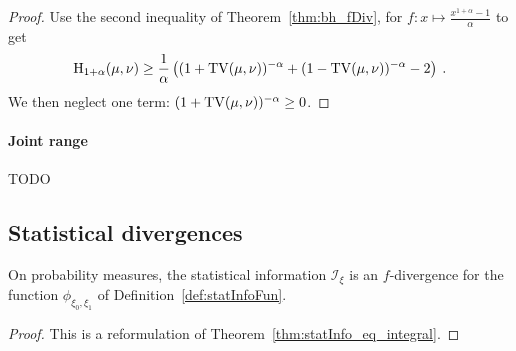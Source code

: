 \begin{proof}%
{}
Use the second inequality of Theorem~\ref{thm:bh_fDiv}, for $f: x \mapsto \frac{x^{1+\alpha} - 1}{\alpha}$ to get
\begin{align*}
\operatorname{H}_{1+\alpha}(\mu, \nu) \ge \frac{1}{\alpha} \left((1 + \operatorname{TV}(\mu, \nu))^{-\alpha} + (1 - \operatorname{TV}(\mu, \nu))^{-\alpha} - 2 \right) \: .
\end{align*}
We then neglect one term: $(1 + \operatorname{TV}(\mu, \nu))^{-\alpha} \ge 0$.
\end{proof}


\paragraph{Joint range}

TODO \cite{harremoes2011pairs}


\subsection{Statistical divergences}

\begin{lemma}
  \label{lem:statInfo_eq_fDiv}
  On probability measures, the statistical information $\mathcal I_\xi$ is an $f$-divergence for the function $\phi_{\xi_0, \xi_1}$ of Definition~\ref{def:statInfoFun}.
\end{lemma}

\begin{proof}%
{}
This is a reformulation of Theorem~\ref{thm:statInfo_eq_integral}.
\end{proof}




